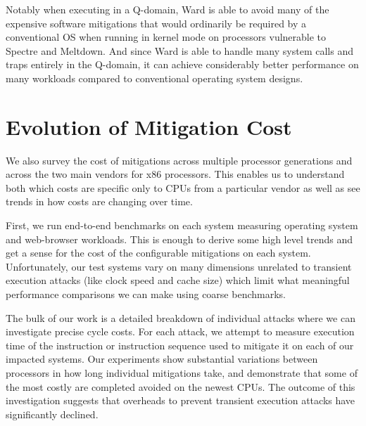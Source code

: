 Notably when executing in a Q-domain, Ward is able to avoid many of the expensive software mitigations that would ordinarily be required by a conventional OS when running in kernel mode on processors vulnerable to Spectre and Meltdown.
And since Ward is able to handle many system calls and traps entirely in the Q-domain, it can achieve considerably better performance on many workloads compared to conventional operating system designs.

\section*{Evolution of Mitigation Cost}
We also survey the cost of mitigations across multiple processor generations and across the two main vendors for x86 processors.
This enables us to understand both which costs are specific only to CPUs from a particular vendor as well as see trends in how costs are changing over time.

First, we run end-to-end benchmarks on each system measuring operating system and web-browser workloads.
This is enough to derive some high level trends and get a sense for the cost of the configurable mitigations on each system.
Unfortunately, our test systems vary on many dimensions unrelated to transient execution attacks (like clock speed and cache size) which limit what meaningful performance comparisons we can make using coarse benchmarks.

The bulk of our work is a detailed breakdown of individual attacks where we can investigate precise cycle costs.
For each attack, we attempt to measure execution time of the instruction or instruction sequence used to mitigate it on each of our impacted systems.
Our experiments show substantial variations between processors in how long individual mitigations take, and demonstrate that some of the most costly are completed avoided on the newest CPUs. 
The outcome of this investigation suggests that overheads to prevent transient execution attacks have significantly declined.
